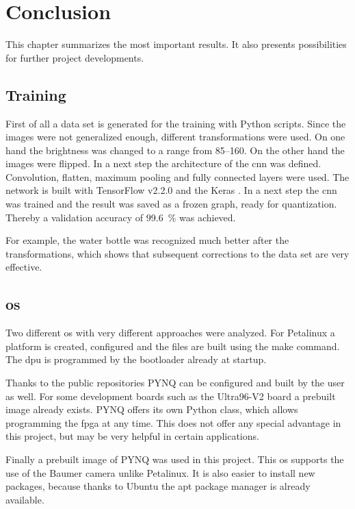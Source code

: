 \chapter{Conclusion}
\label{ch:conclusion}
This chapter summarizes the most important results.
It also presents possibilities for further project developments.

\section{Training}
\label{sec:conclusion:training}
First of all a data set is generated for the training with Python scripts.
Since the images were not generalized enough, different transformations were used.
On one hand the brightness was changed to a range from \numrange{85}{160}.
On the other hand the images were flipped.
In a next step the architecture of the \acrshort{cnn} was defined.
Convolution, flatten, maximum pooling and fully connected layers were used.
The network is built with TensorFlow v2.2.0 and the Keras .
In a next step the \acrshort{cnn} was trained and the result was saved as a frozen graph, ready for quantization.
Thereby a validation accuracy of \SI{99.6}{\%} was achieved.

For example, the water bottle was recognized much better after the transformations, which shows that subsequent corrections to the data set are very effective. 

\section{\Acrlong{os}}
\label{sec:conclusion:os}
Two different \acrshort{os} with very different approaches were analyzed.
For Petalinux a platform is created, configured and the files are built using the make command.
The \acrshort{dpu} is programmed by the bootloader already at startup.

Thanks to the public repositories PYNQ can be configured and built by the user as well.
For some development boards such as the Ultra96-V2 board a prebuilt image already exists.
PYNQ offers its own Python class, which allows programming the \acrshort{fpga} at any time.
This does not offer any special advantage in this project, but may be very helpful in certain applications.

Finally a prebuilt image of PYNQ was used in this project.
This \acrlong{os} supports the use of the Baumer camera unlike Petalinux.
It is also easier to install new packages, because thanks to Ubuntu the apt package manager is already available.

